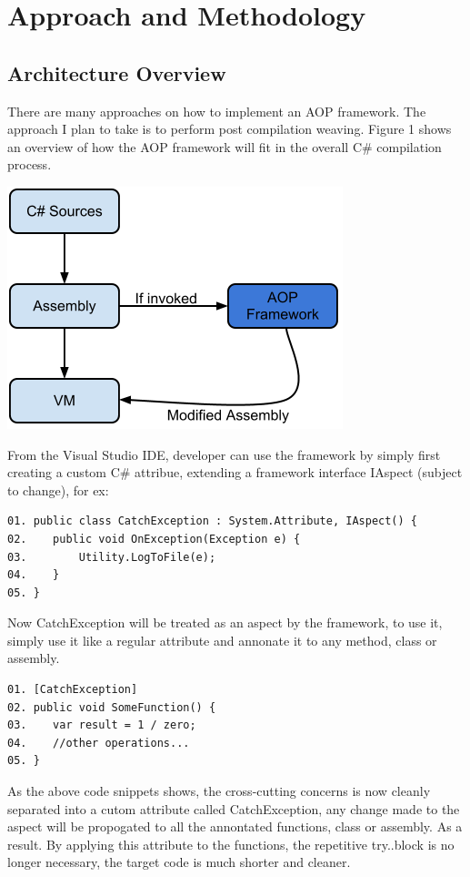 \section{Approach and Methodology}
\subsection{Architecture Overview}
There are many approaches on how to implement an AOP framework. The approach I plan to take is to perform post compilation weaving. Figure 1 shows an overview of how the AOP framework will fit in the overall C\# compilation process.

\includegraphics[scale=0.70]{model_overview.png}

From the Visual Studio IDE, developer can use the framework by simply first creating a custom C\# attribue, extending a framework interface IAspect (subject to change), for ex:

\begin{verbatim}
01. public class CatchException : System.Attribute, IAspect() {
02.    public void OnException(Exception e) {
03.        Utility.LogToFile(e);
04.    } 
05. }
\end{verbatim}

Now CatchException will be treated as an aspect by the framework, to use it, simply use it like a regular attribute and annonate it to any method, class or assembly.

\begin{verbatim}
01. [CatchException]
02. public void SomeFunction() {
03.    var result = 1 / zero;
04.    //other operations...
05. }
\end{verbatim}

As the above code snippets shows, the cross-cutting concerns is now cleanly separated into a cutom attribute called CatchException, any change made to the aspect will be propogated to all the annontated functions, class or assembly. As a result. By applying this attribute to the functions, the repetitive try..block is no longer necessary, the target code is much shorter and cleaner. 

